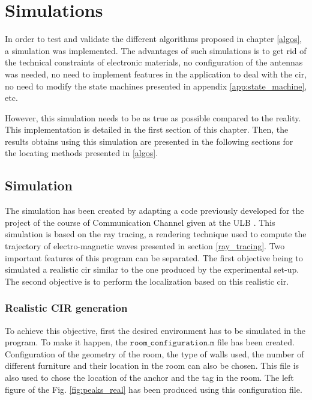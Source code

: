 \chapter{Simulations}
\label{simulations}

In order to test and validate the different algorithms proposed in chapter \ref{algos}, a simulation was implemented. The advantages of such simulations is to get rid of the technical constraints of electronic materials, no configuration of the antennas was needed, no need to implement features in the application to deal with the \gls{cir}, no need to modify the state machines presented in appendix \ref{app:state_machine}, etc.
\vspace{2mm}

However, this simulation needs to be as true as possible compared to the reality. This implementation is detailed in the first section of this chapter. Then, the results obtains using this simulation are presented in the following sections for the locating methods presented in \ref{algos}.

\section{Simulation}

The simulation has been created by adapting a code previously developed for the project of the course of Communication Channel given at the ULB \cite{dedoncker2019course}. This simulation is based on the ray tracing, a rendering technique used to compute the trajectory of electro-magnetic waves presented in section \ref{ray_tracing}. Two important features of this program can be separated. The first objective being to simulated a realistic \gls{cir} similar to the one produced by the experimental set-up. The second objective is to perform the localization based on this realistic \gls{cir}.
\vspace{2mm}

\subsection{Realistic CIR generation}

To achieve this objective, first the desired environment has to be simulated in the program. To make it happen, the $\texttt{room\_configuration.m}$ file has been created. Configuration of the geometry of the room, the type of walls used, the number of different furniture and their location in the room can also be chosen. This file is also used to chose the location of the anchor and the tag in the room. The left figure of the Fig. \ref{fig:peaks_real} has been produced using this configuration file.
\vspace{2mm}

